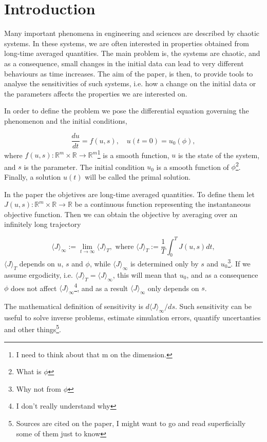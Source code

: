 \documentclass[10pt,twoside,a4paper]{article} %
\begin{document}
\section{Introduction}
Many important phenomena in engineering and sciences are described by chaotic systems. In these systems, we are often interested in properties obtained from long-time averaged quantities. The main problem is, the systems are chaotic, and as a consequence, small changes in the initial data can lead to very different behaviours as time increases. The aim of the paper, is then, to provide tools to analyse the sensitivities of such systems, i.e. how a change on the initial data or the parameters affects the properties we are interested on.

In order to define the problem we pose the differential equation governing the phenomenon and the initial conditions,

\begin{equation}
\frac{du}{dt} = f(u,s), \quad u(t=0) = u_0(\phi),
\label{eq:1}
\end{equation}
where $f(u,s): \mathbb{R}^m \times \mathbb{R} \rightarrow \mathbb{R}^m$\footnote{I need to think about that m on the dimension.} is a smooth function, $u$ is the state of the system, and $s$ is the parameter. The initial condition $u_0$ is a smooth function of $\phi$\footnote{What is $\phi$}. Finally, a solution $u(t)$ will be called the primal solution.

In the paper the objetives are long-time averaged quantities. To define them let $J(u,s): \mathbb{R}^m \times \mathbb{R} \rightarrow \mathbb{R}$ be a continuous function representing the instantaneous objective function. Then we can obtain the objective by averaging over an infinitely long trajectory

\begin{equation}
  \langle J \rangle_\infty := \lim_{t\to\infty} \langle J \rangle_T, \textrm{ where } \langle J \rangle_T := \frac{1}{T}\int_0^T J(u,s)dt,
  \label{eq:2}
\end{equation}
$\langle J \rangle_T$ depends on $u$, $s$ and $\phi$, while $\langle J \rangle_\infty$ is determined only by $s$ and $u_0$\footnote{Why not from $\phi$}. If we assume ergodicity, i.e. $\langle J \rangle_T = \langle J \rangle_\infty$, this will mean that $u_0$, and as a consequence $\phi$ does not affect $\langle J \rangle_\infty$\footnote{I don't really understand why}, and as a result $\langle J \rangle_\infty$ only depends on $s$.

The mathematical definition of sensitivity is $d\langle J \rangle_\infty / ds$. Such sensitivity can be useful to solve inverse problems, estimate simulation errors, quantify uncertanties and other things\footnote{Sources are cited on the paper, I might want to go and read superficially some of them just to know}.
\end{document}
